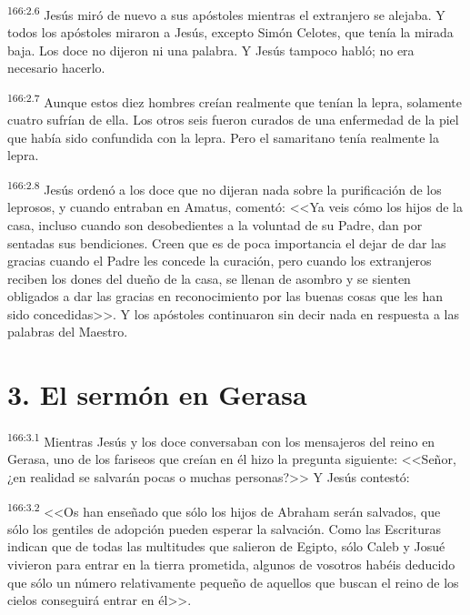 \par 
\textsuperscript{166:2.6} Jesús miró de nuevo a sus apóstoles mientras el extranjero se alejaba. Y todos los apóstoles miraron a Jesús, excepto Simón Celotes, que tenía la mirada baja. Los doce no dijeron ni una palabra. Y Jesús tampoco habló; no era necesario hacerlo.

\par 
\textsuperscript{166:2.7} Aunque estos diez hombres creían realmente que tenían la lepra, solamente cuatro sufrían de ella. Los otros seis fueron curados de una enfermedad de la piel que había sido confundida con la lepra. Pero el samaritano tenía realmente la lepra.

\par 
\textsuperscript{166:2.8} Jesús ordenó a los doce que no dijeran nada sobre la purificación de los leprosos, y cuando entraban en Amatus, comentó: <<Ya veis cómo los hijos de la casa, incluso cuando son desobedientes a la voluntad de su Padre, dan por sentadas sus bendiciones. Creen que es de poca importancia el dejar de dar las gracias cuando el Padre les concede la curación, pero cuando los extranjeros reciben los dones del dueño de la casa, se llenan de asombro y se sienten obligados a dar las gracias en reconocimiento por las buenas cosas que les han sido concedidas>>. Y los apóstoles continuaron sin decir nada en respuesta a las palabras del Maestro.

\section*{3. El sermón en Gerasa}
\par 
\textsuperscript{166:3.1} Mientras Jesús y los doce conversaban con los mensajeros del reino en Gerasa, uno de los fariseos que creían en él hizo la pregunta siguiente: <<Señor, ¿en realidad se salvarán pocas o muchas personas?>> Y Jesús contestó:

\par 
\textsuperscript{166:3.2} <<Os han enseñado que sólo los hijos de Abraham serán salvados, que sólo los gentiles de adopción pueden esperar la salvación. Como las Escrituras indican que de todas las multitudes que salieron de Egipto, sólo Caleb y Josué vivieron para entrar en la tierra prometida, algunos de vosotros habéis deducido que sólo un número relativamente pequeño de aquellos que buscan el reino de los cielos conseguirá entrar en él>>.

